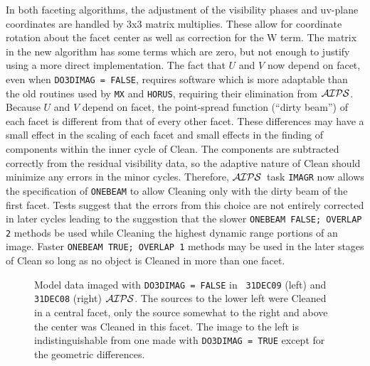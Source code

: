 \documentclass[twoside]{article}
\newcommand{\AIPS}{{$\cal AIPS\/$}}
\begin{document}
In both faceting algorithms, the adjustment of the visibility phases
and uv-plane coordinates are handled by 3x3 matrix multiplies.  These
allow for coordinate rotation about the facet center as well as
correction for the W term.  The matrix in the new algorithm has some
terms which are zero, but not enough to justify using a more direct
implementation.  The fact that $U$ and $V$ now depend on facet, even
when {\tt DO3DIMAG = FALSE}, requires software which is more adaptable
than the old routines used by {\tt MX} and {\tt HORUS}, requiring
their elimination from \AIPS\@.  Because $U$ and $V$ depend on facet,
the point-spread function (``dirty beam'') of each facet is different
from that of every other facet.  These differences may have a small
effect in the scaling of each facet and small effects in the finding
of components within the inner cycle of Clean.  The components are
subtracted correctly from the residual visibility data, so the
adaptive nature of Clean should minimize any errors in the minor
cycles.  Therefore, \AIPS\ task {\tt IMAGR} now allows the specification
of {\tt ONEBEAM} to allow Cleaning only with the dirty beam of the
first facet.  Tests suggest that the errors from this choice are not
entirely corrected in later cycles leading to the suggestion that the
slower {\tt ONEBEAM FALSE; OVERLAP 2} methods be used while Cleaning
the highest dynamic range portions of an image.  Faster {\tt ONEBEAM
TRUE; OVERLAP 1} methods may be used in the later stages of Clean so
long as no object is Cleaned in more than one facet.

\begin{figure}
\centering
{}
\caption{Model data imaged with {\tt DO3DIMAG = FALSE} in {\tt
    31DEC09} (left) and {\tt 31DEC08} (right) \AIPS\@.  The sources to
  the lower left were Cleaned in a central facet, only the source
  somewhat to the right and above the center was Cleaned in this
  facet.  The image to the left is indistinguishable from one made
  with {\tt DO3DIMAG = TRUE} except for the geometric differences.}
\end{figure}
\end{document}
